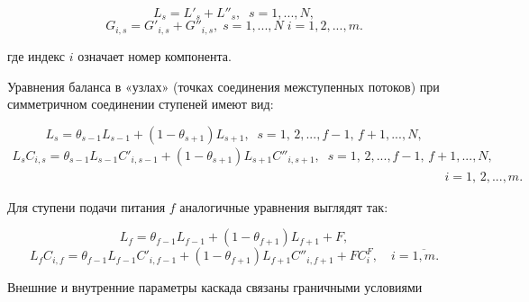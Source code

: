 \begin{equation} \label{EQ__1_22_} 
  L_{s} =L'_{s} +L''_{s} ,\; \; s=1,...,N,            
  \end{equation} 
  \begin{equation} \label{EQ__1_23_} 
  G_{i,s} =G'_{i,s} +G''_{i,s} ,\;s=1,...,N \; i=1,2,...,m.           
  \end{equation} 

где индекс $i$ означает номер компонента.

Уравнения баланса в «узлах» (точках соединения межступенных потоков) при симметричном соединении ступеней имеют вид:

\begin{equation} \label{EQ__1_24_} 
  L_{s} =\theta _{s-1} L_{s-1} +(1-\theta _{s+1} )L_{s+1} ,\; \; s=1,\, 2,...,f-1,\, f+1,...,N, 
  \end{equation} 
  \begin{equation} \label{EQ__1_25_} 
  \begin{array}{l} {L_{s} C_{i,s} =\theta _{s-1} L_{s-1} C'_{i,s-1} +(1-\theta _{s+1} )L_{s+1} C''_{i,s+1} ,\; \; s=1,\, 2,...,f-1,\, f+1,...,N,} \\ {\; \; \; \; \; \; \; \; \; \; \; \; \; \; \; \; \; \; \; \; \; \; \; \; \; \; \; \; \; \; \; \; \; \quad \quad \quad \quad \quad \; \; \; \; \; \; \; \; \; \; \; \; \; \quad \quad \quad \; \; \; \; \; \; \; \; \; \; \; \; \; \quad \quad \quad \; \; \; \; \; \; \; \; \; \; \; \; \; \quad \quad \; \quad i=1,\, 2,...,m.} \end{array} 
  \end{equation} 

Для ступени подачи питания $f$ аналогичные уравнения выглядят так:

\begin{equation} \label{EQ__1_26_} 
  L_{f} =\theta _{f-1} L_{f-1} +(1-\theta _{f+1} )L_{f+1} +F, 
  \end{equation} 
  \begin{equation} \label{EQ__1_27_} 
  L_{f} C_{i,f} =\theta _{f-1} L_{f-1} C'_{i,f-1} +(1-\theta _{f+1} )L_{f+1} C''_{i,f+1} +FC_{i}^{F} ,\quad i=\overline{1,m}.            
\end{equation}

Внешние и внутренние параметры каскада связаны граничными условиями


